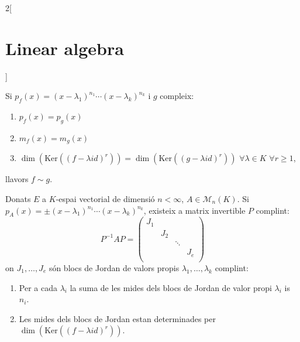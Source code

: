 \documentclass[../../../main.tex]{subfiles}
\begin{document}
\begin{multicols}{2}[\section{Linear algebra}]
\begin{theorem}
\end{theorem}
\begin{theorem}
Si $p_f(x)=(x-\lambda_1)^{n_1}\cdots(x-\lambda_k)^{n_k}$ i $g$ compleix:
\begin{enumerate}
    \item $p_f(x)=p_g(x)$
    \item $m_f(x)=m_g(x)$
    \item $\dim(\text{Ker}((f-\lambda id)^r))=\dim(\text{Ker}((g-\lambda id)^r))$ $\forall\lambda\in K$ $\forall r\geq 1$,
\end{enumerate}
llavors $f\sim g$.
\end{theorem}
\begin{prop}
Donats $E$ a $K$-espai vectorial de dimensió $n<\infty$, $A\in\mathcal{M}_n(K)$. Si $p_A(x)=\pm(x-\lambda_1)^{n_1}\cdots(x-\lambda_k)^{n_k}$, existeix a matrix invertible $P$ complint: $$P^{-1}AP=\begin{pmatrix}
J_1 & & & \\
& J_2 & & \\
& & \ddots & \\
& & & J_e \\
\end{pmatrix}$$
on $J_1,\ldots,J_e$ són blocs de Jordan de valors propis $\lambda_1,\ldots,\lambda_k$ complint:
\begin{enumerate}
    \item Per a cada $\lambda_i$ la suma de les mides dels blocs de Jordan de valor propi $\lambda_i$ is $n_i$.
    \item Les mides dels blocs de Jordan estan determinades per $\dim(\text{Ker}((f-\lambda id)^r))$.
\end{enumerate}
\end{prop}

\end{multicols}
\end{document}
